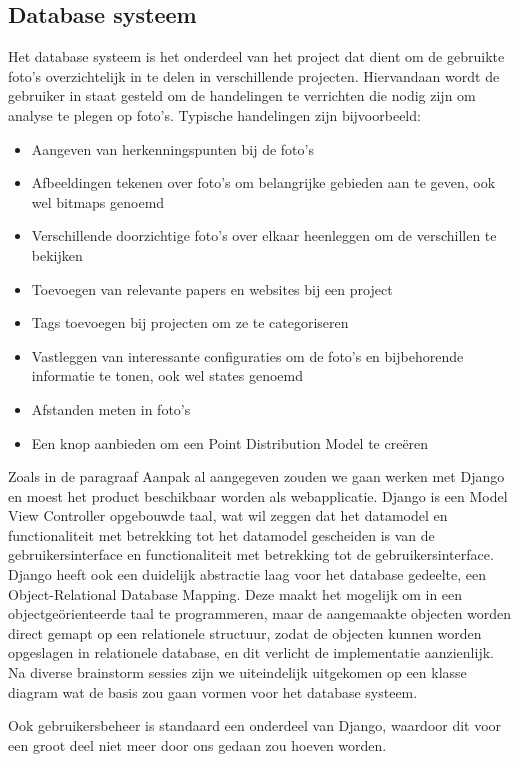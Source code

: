 \subsection{Database systeem}
Het database systeem is het onderdeel van het project dat dient om de gebruikte foto's overzichtelijk in te delen in verschillende projecten. Hiervandaan wordt de gebruiker in staat gesteld om de handelingen te verrichten die nodig zijn om analyse te plegen op  foto's. Typische handelingen zijn bijvoorbeeld: 

\begin{itemize}
\item Aangeven van herkenningspunten bij de foto's
\item Afbeeldingen tekenen over foto's om belangrijke gebieden aan te geven, ook wel bitmaps genoemd
\item Verschillende doorzichtige foto's over elkaar heenleggen om de verschillen te bekijken
\item Toevoegen van relevante papers en websites bij een project
\item Tags toevoegen bij projecten om ze te categoriseren
\item Vastleggen van interessante configuraties om de foto's en bijbehorende informatie te tonen, ook wel states genoemd
\item Afstanden meten in foto's
\item Een knop aanbieden om een Point Distribution Model te cre\"{e}ren
\end{itemize}

Zoals in de paragraaf Aanpak al aangegeven zouden we gaan werken met Django en moest het product beschikbaar worden als webapplicatie. Django is een Model View Controller opgebouwde taal, wat wil zeggen dat het datamodel en functionaliteit met betrekking tot het datamodel gescheiden is van de gebruikersinterface en functionaliteit met betrekking tot de gebruikersinterface. Django heeft ook een duidelijk abstractie laag voor het database gedeelte, een Object-Relational Database Mapping. Deze maakt het mogelijk om in een object\-ge\"{o}rienteerde taal te programmeren, maar de aangemaakte objecten worden direct gemapt op een relationele structuur, zodat de objecten kunnen worden opgeslagen in relationele database, en dit verlicht de implementatie aanzienlijk. Na diverse brainstorm sessies zijn we uiteindelijk uitgekomen op een klasse diagram\pageref{Databasediagram} wat de basis zou gaan vormen voor het database systeem.

Ook gebruikers\-beheer is standaard een onderdeel van Django, waardoor dit voor een groot deel niet meer door ons gedaan zou hoeven worden.

